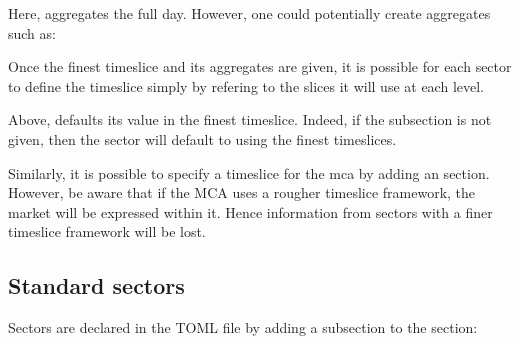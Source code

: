 \documentclass[letterpaper,10pt,english]{sphinxmanual}
\begin{document}
Here,  aggregates the full day. However, one could potentially create
aggregates such as:

\begin{sphinxVerbatim}[commandchars=\\\{\}]
  
  
\end{sphinxVerbatim}

Once the finest timeslice and its aggregates are given, it is  possible for each sector
to define the timeslice simply by refering to the slices it will use at each level.

\begin{sphinxVerbatim}[commandchars=\\\{\}]
  
  
\end{sphinxVerbatim}

Above,  defaults its value in the finest
timeslice. Indeed, if the subsection  is not
given, then the sector will default to using the finest timeslices.

Similarly, it is possible to specify a timeslice for the mca by adding an
 section. However, be aware that if the MCA uses a rougher
timeslice framework, the market will be expressed within it. Hence information from
sectors with a finer timeslice framework will be lost.


\subsection{Standard sectors}
\label{\detokenize{inputs/toml:standard-sectors}}
Sectors are declared in the TOML file by adding a subsection to the  section:

\begin{sphinxVerbatim}[commandchars=\\\{\}]
  
  
\end{sphinxVerbatim}
\end{document}
